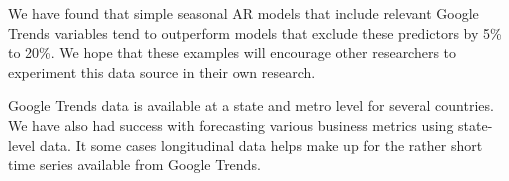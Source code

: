 \documentclass[12pt, oneside]{article}
\begin{document}
We have found that simple seasonal AR models that include relevant
Google Trends variables tend to outperform models that exclude these
predictors by 5\% to 20\%.  We hope that these examples will encourage
other researchers to experiment this data source in their own
research.

Google Trends data is available at a state and metro level for several
countries.  We have also had success with forecasting various business
metrics using state-level data.  It some cases longitudinal data helps
make up for the rather short time series available from Google Trends.

\newpage



\end{document}
